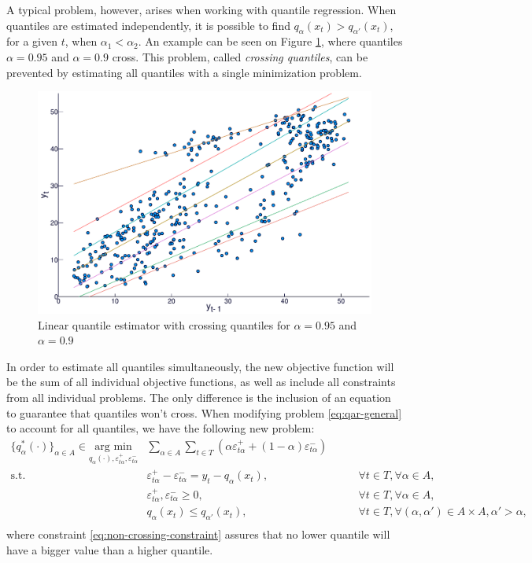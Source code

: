A typical problem, however, arises when working with quantile regression. When quantiles are estimated independently, it is possible to find $q_{\alpha}(x_t) > q_{\alpha'}(x_t)$, for a given $t$, when $\alpha_1 < \alpha_2$. An example can be seen on Figure \ref{fig:crossing-quantiles}, where quantiles $\alpha = 0.95$ and $\alpha = 0.9$ cross. This problem, called \textit{crossing quantiles}, can be prevented by estimating all quantiles with a single minimization problem.
\begin{figure}
	\centering
	\includegraphics[width=0.6\linewidth]{./Figuras/regressao-quantilica/icaraizinho-quantile-linear-scatter-crossing}
	\caption{Linear quantile estimator with crossing quantiles for $\alpha = 0.95$ and $\alpha = 0.9$}
	\label{fig:crossing-quantiles}
\end{figure}

In order to estimate all quantiles simultaneously, the new objective function will be the sum of all individual objective functions, as well as include all constraints from all individual problems. The only difference is the inclusion of an equation to guarantee that quantiles won't cross.  When modifying problem \ref{eq:qar-general} to account for all quantiles, we have the following new problem:
\begin{eqnarray}
\label{eq:non-crossing-quantiles1}
\{q^*_{\alpha}(\cdot)\}_{\alpha \in A}  \in \underset{q_\alpha(\cdot),\varepsilon_{t \alpha}^{+}, \varepsilon_{t \alpha}^-}{\text{arg min}} &  \sum_{\alpha \in A} \sum_{t \in T}\left(\alpha \varepsilon_{t \alpha}^++(1-\alpha)\varepsilon_{t \alpha}^{-}\right) &  \\
\mbox{s.t. } & \varepsilon_{t \alpha}^{+}-\varepsilon_{t \alpha}^{-}=y_{t}-q_\alpha(x_{t}), & \qquad\forall t \in T,\forall \alpha \in A,\\
& \varepsilon_{t \alpha}^+,\varepsilon_{t \alpha}^- \geq 0, & \qquad\forall t \in T,\forall \alpha \in A,\\\label{eq:non-crossing-constraint}
& q_{\alpha}(x_t) \leq q_{\alpha'}(x_t), & \qquad \forall t \in T, \forall (\alpha, \alpha') \in A \times A,  \alpha' > \alpha,\nonumber\\
\end{eqnarray}
where constraint \ref{eq:non-crossing-constraint} assures that no lower quantile will have a bigger value than a higher quantile.





